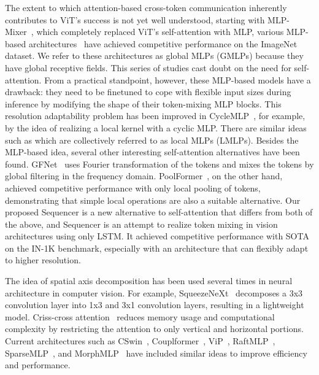 \documentclass{article}
\begin{document}
The extent to which attention-based cross-token communication inherently contributes to ViT's success is not yet well understood, starting with MLP-Mixer~\cite{tolstikhin2021mlp}, which completely replaced ViT's self-attention with MLP, various MLP-based architectures~\cite{touvron2021resmlp,liu2021pay,hou2022vision, tatsunami2021raftmlp, tang2021sparse, ding2021repmlpnet} have achieved competitive performance on the ImageNet dataset. We refer to these architectures as global MLPs (GMLPs) because they have global receptive fields. This series of studies cast doubt on the need for self-attention. From a practical standpoint, however, these MLP-based models have a drawback: they need to be finetuned to cope with flexible input sizes during inference by modifying the shape of their token-mixing MLP blocks. This resolution adaptability problem has been improved in CycleMLP~\cite{chen2022cyclemlp}, for example, by the idea of realizing a local kernel with a cyclic MLP. There are similar ideas such as \cite{yu2022s2,yu2021s,lian2021mlp,guo2021hire} which are collectively referred to as local MLPs (LMLPs). Besides the MLP-based idea, several other interesting self-attention alternatives have been found. GFNet~\cite{rao2021global} uses Fourier transformation of the tokens and mixes the tokens by global filtering in the frequency domain. PoolFormer~\cite{yu2021metaformer}, on the other hand, achieved competitive performance with only local pooling of tokens, demonstrating that simple local operations are also a suitable alternative. Our proposed Sequencer is a new alternative to self-attention that differs from both of the above, and Sequencer is an attempt to realize token mixing in vision architectures using only LSTM. It achieved competitive performance with SOTA on the IN-1K benchmark, especially with an architecture that can flexibly adapt to higher resolution.

The idea of spatial axis decomposition has been used several times in neural architecture in computer vision. For example, SqueezeNeXt~\cite{gholami2018squeezenext} decomposes a 3x3 convolution layer into 1x3 and 3x1 convolution layers, resulting in a lightweight model. Criss-cross attention~\cite{huang2019ccnet} reduces memory usage and computational complexity by restricting the attention to only vertical and horizontal portions. Current architectures such as CSwin~\cite{dong2022cswin}, Couplformer~\cite{lan2021couplformer}, ViP~\cite{hou2022vision}, RaftMLP~\cite{tatsunami2021raftmlp}, SparseMLP~\cite{tang2021sparse}, and MorphMLP~\cite{zhang2021morphmlp} have included similar ideas to improve efficiency and performance.
\end{document}
